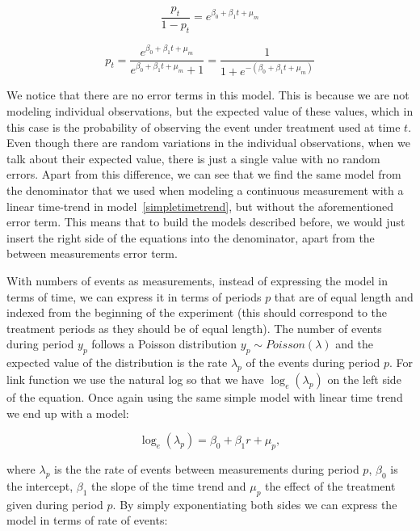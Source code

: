 \documentclass[12pt,a4paper,leqno]{report}
\theoremstyle{plain}
\theoremstyle{definition}
\theoremstyle{remark}
\begin{document}
\begin{def}\label{}
    \begin{equation}\label{}
        \frac{p_t}{1-p_t}=e^{\beta_0 + \beta_1 t + \mu_m}
    \end{equation}
\end{def}

\begin{def}\label{}
    \begin{equation}\label{}
        p_t=\frac{e^{\beta_0 + \beta_1 t + \mu_m}}{e^{\beta_0 + \beta_1 t + \mu_m}+1}=\frac{1}{1+e^{-(\beta_0 + \beta_1 t + \mu_m)}}
    \end{equation}
\end{def}

We notice that there are no error terms in this model. This is because we are
not modeling individual observations, but the expected value of these values, which in
this case is the probability of observing the event under treatment used at time \(t\).
Even though there are random variations in the individual observations,
when we talk about their expected value, there is just a single value with no
random errors. Apart from this difference, we can see that we find the same model
from the denominator that we used when modeling a continuous measurement with a
linear time-trend in model\ \ref{simpletimetrend}, but without the
aforementioned error term. This means that to build the models described before,
we would just insert the right side of the equations into the denominator, apart
from the between measurements error term.

With numbers of events as measurements, instead of expressing the model in terms
of time, we can express it in terms of periods \(p\) that are of equal length
and indexed from the beginning of the experiment (this should correspond to the
treatment periods as they should be of equal length). The number of events during
period \(y_p\) follows a Poisson distribution \(y_p \sim Poisson(\lambda)\) and
the expected value of the distribution is the rate \(\lambda_p \) of the events
during period \(p\). For link function we use the natural log so that we have
\(\log_e(\lambda_p)\) on the left side of the equation. Once again using the
same simple model with linear time trend we end up with a model:

\begin{def}\label{oneerror}
    \begin{equation}
        \log_e(\lambda_p)=\beta_0 + \beta_1 r + \mu_{p},
    \end{equation}
\end{def}where \(\lambda_p\) is the the rate of events between measurements
during period \(p\), \(\beta_0\) is the intercept, \(\beta_1\) the slope of the
time trend and \(\mu_p\) the effect of the treatment given during period \(p\).
By simply exponentiating both sides we can express the model in terms of rate of
events:
\end{document}
